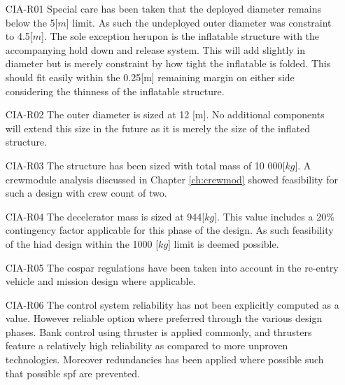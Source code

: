 \begin{itemize}[leftmargin=+20mm]
\item[CIA-R01] Special care has been taken that the deployed diameter remains below the 5[$m$] limit. As such the undeployed outer diameter was constraint to 4.5[$m$]. The sole exception herupon is the inflatable structure with the accompanying hold down and release system. This will add slightly in diameter but is merely constraint by how tight the inflatable is folded. This should fit easily within the 0.25[m] remaining margin on either side considering the thinness of the inflatable structure. 
\item[CIA-R02] The outer diameter is sized at 12 [m]. No additional components will extend this size in the future as it is merely the size of the inflated structure.
\item[CIA-R03] The structure has been sized with total mass of 10 000[$kg$]. A crewmodule analysis discussed in Chapter \ref{ch:crewmod} showed feasibility for such a design with crew count of two.
\item[CIA-R04] The decelerator mass is sized at 944[$kg$]. This value includes a 20\% contingency factor applicable for this phase of the design. As such feasibility of the \gls{hiad} design within the 1000 [$kg$] limit is deemed possible.
\item[CIA-R05] The \gls{cospar} regulations have been taken into account in the re-entry vehicle and mission design where applicable.
\item[CIA-R06] The control system reliability has not been explicitly computed as a value. However reliable option where preferred through the various design phases. Bank control using thruster is applied commonly, and thrusters feature a relatively high reliability as compared to more unproven technologies. Moreover redundancies has been applied where possible such that possible \gls{spf} are prevented. 
\end{itemize}



